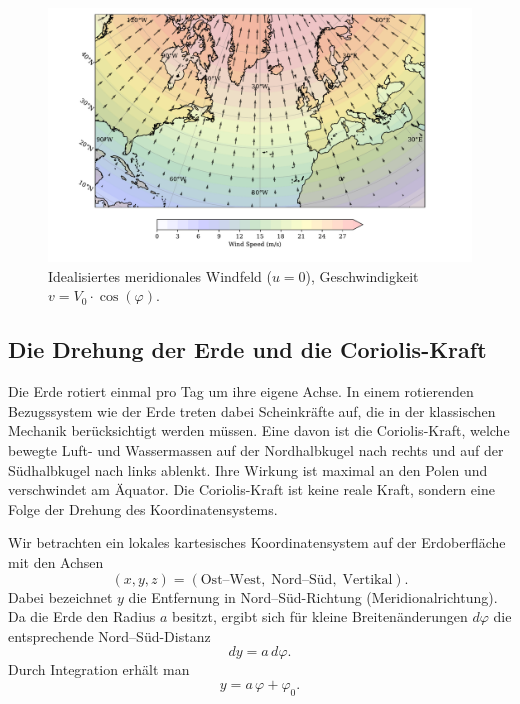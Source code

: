 \begin{figure}
	\centering
	\includegraphics[width=\textwidth, trim=1cm 0cm 2cm 0cm, clip]{papers/rossby/images/meridional_wind_plot.pdf}
	\caption{Idealisiertes meridionales Windfeld (\(u=0\)), Geschwindigkeit \(v = V_0 \cdot \cos(\varphi)\).}
	\label{fig:meridional_wind}
\end{figure}

\subsection{Die Drehung der Erde und die Coriolis-Kraft}

Die Erde rotiert einmal pro Tag um ihre eigene Achse. In einem rotierenden
Bezugssystem wie der Erde treten dabei Scheinkräfte auf, die in der klassischen
Mechanik berücksichtigt werden müssen. Eine davon ist die {Coriolis-Kraft},
welche bewegte Luft- und Wassermassen auf der {Nordhalbkugel} nach rechts und
%
%
auf der {Südhalbkugel} nach links ablenkt. Ihre Wirkung ist maximal an den
Polen und verschwindet am Äquator. Die Coriolis-Kraft ist keine reale Kraft,
sondern eine Folge der Drehung des Koordinatensystems.

Wir betrachten ein lokales kartesisches Koordinatensystem auf der Erdoberfläche
mit den Achsen
\begin{equation}
	(x,y,z) = (\text{Ost–West}, \; \text{Nord–Süd}, \; \text{Vertikal}).
\end{equation}
Dabei bezeichnet \(y\) die Entfernung in Nord–Süd-Richtung (Meridionalrichtung).
Da die Erde den Radius \(a\) besitzt, ergibt sich für kleine Breitenänderungen \(d\varphi\) die entsprechende Nord–Süd-Distanz
\begin{equation}
	dy = a \, d\varphi.
\end{equation}
Durch Integration erhält man
\begin{equation}
	y = a \, \varphi + \varphi_0.
\end{equation}

